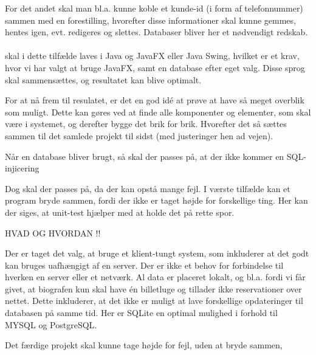 For det andet skal man bl.a. kunne koble et kunde-id (i form af telefonnummer) sammen med en forestilling, hvorefter disse informationer skal kunne gemmes, hentes igen, evt. redigeres og slettes. Databaser bliver her et nødvendigt redskab.
\\\\

skal i dette tilfælde laves i Java og JavaFX eller Java Swing, hvilket er et krav, hvor vi har valgt at bruge JavaFX, samt en database efter eget valg. Disse sprog skal sammensættes, og resultatet kan blive optimalt.

For at nå frem til resulatet, er det en god idé at prøve at have så meget overblik som muligt. Dette kan gøres ved at finde alle komponenter og elementer, som skal være i systemet, og derefter bygge det brik for brik. Hvorefter det så sættes sammen til det samlede projekt til sidst (med justeringer hen ad vejen).

Når en database bliver brugt, så skal der passes på, at der ikke kommer en SQL-injicering 

Dog skal der passes på, da der kan opstå mange fejl. I værste tilfælde kan et program bryde sammen, fordi der ikke er taget højde for forskellige ting. Her kan der siges, at unit-test hjælper med at holde det på rette spor. 

 



HVAD OG HVORDAN !! 

Der er taget det valg, at bruge et klient-tungt system, som inkluderer at det godt kan bruges uafhængigt af en server. Der er ikke et behov for forbindelse til hverken en server eller et netværk. Al data er placeret lokalt, og bl.a. fordi vi får givet, at biografen kun skal have én billetluge og tillader ikke reservationer over nettet. Dette inkluderer, at det ikke er muligt at lave forskellige opdateringer til databasen på samme tid. Her er SQLite en optimal mulighed i forhold til MYSQL og PostgreSQL.



Det færdige projekt skal kunne tage højde for fejl, uden at bryde sammen, 

